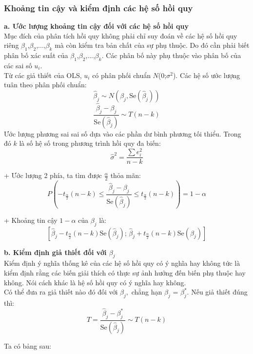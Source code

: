 \subsubsection{Khoảng tin cậy và kiểm định các hệ số hồi quy}
\textbf{a. Ước lượng khoảng tin cậy đối với các hệ số hồi quy}\\
Mục đích của phân tích hồi quy không phải chỉ suy đoán về các hệ số hồi quy riêng $\beta_1$,$\beta_2$,...,$\beta_k$  mà còn kiểm tra bản chất của sự phụ thuộc. Do đó cần phải biết phân bố xác suất của  $\beta_1$,$\beta_2$,...,$\beta_k$. Các phân bố này phụ thuộc vào phân bố của các sai số $u_i$.\\
Từ các giả thiết của OLS, $u_i$ có phân phối chuẩn $N$(0;$\sigma^2$). Các hệ số ước lượng tuân theo phân phối chuẩn:
\begin{equation*}
\hat{\beta}_j \sim N \left( \beta_j, \text{Se}(\hat{\beta}_j) \right)
\end{equation*}
\begin{equation*}
\frac{\hat{\beta}_j - \beta_j}{\text{Se}(\hat{\beta}_j)} \sim T(n - k)
\end{equation*}
Ước lượng phương sai sai số dựa vào các phần dư bình phương tối thiểu. Trong đó $k$ là số hệ số trong phương trình hồi quy đa biến:
\[
\hat{\sigma}^2 = \frac{\sum e_i^2}{n - k}
\]

+ Ước lượng 2 phía, ta tìm được $\frac{\alpha}{2}$ thỏa mãn:
\[
P\left( -t_{\frac{\alpha}{2}} (n - k) \leq \frac{\hat{\beta}_j - \beta_j}{\text{Se}(\hat{\beta}_j)} \leq t_{\frac{\alpha}{2}} (n - k) \right) = 1 - \alpha
\]

+ Khoảng tin cậy $1 - \alpha$ của $\beta_j$ là:
\[
\left[ \hat{\beta}_j - t_{\frac{\alpha}{2}} (n - k) \text{Se}(\hat{\beta}_j); \, \hat{\beta}_j + t_{\frac{\alpha}{2}} (n - k) \text{Se}(\hat{\beta}_j) \right]
\]

\textbf {b. Kiểm định giả thiết đối với $\beta_j$}\\
Kiểm định ý nghĩa thống kê của các hệ số hồi quy có ý nghĩa hay không tức là kiểm định rằng các biến giải thích có thực sự ảnh hưởng đến biến phụ thuộc hay không. Nói cách khác là hệ số hồi quy có ý nghĩa hay không.\\
Có thể đưa ra giả thiết nào đó đối với $\beta_j,$ chẳng hạn $\beta_j$ = $\beta_j^*$. Nếu giả thiết đúng thì:
\[
T = \frac{\hat{\beta}_j - \beta_j^*}{\text{Se}\left(\hat{\beta}_j\right)} \sim T(n-k)
\]

Ta có bảng sau:

